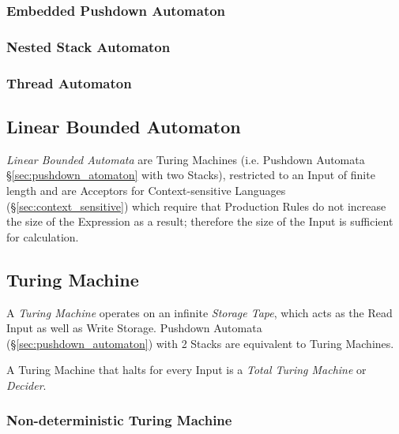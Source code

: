 \subsubsection{Embedded Pushdown Automaton}\label{sec:embedded_pushdown}

\subsubsection{Nested Stack Automaton}\label{sec:nested_stack_automaton}

\subsubsection{Thread Automaton}\label{sec:thread_automaton}



\subsection{Linear Bounded Automaton} \label{sec:linear_bounded_automaton}

\emph{Linear Bounded Automata} are Turing Machines (i.e. Pushdown
Automata \S\ref{sec:pushdown_atomaton} with two Stacks), restricted to
an Input of finite length and are Acceptors for Context-sensitive
Languages (\S\ref{sec:context_sensitive}) which require that
Production Rules do not increase the size of the Expression as a
result; therefore the size of the Input is sufficient for calculation.



\subsection{Turing Machine}\label{sec:turing_machine}

A \emph{Turing Machine} operates on an infinite \emph{Storage Tape},
which acts as the Read Input as well as Write Storage. Pushdown
Automata (\S\ref{sec:pushdown_automaton}) with 2 Stacks are equivalent
to Turing Machines.

A Turing Machine that halts for every Input is a \emph{Total Turing
  Machine} or \emph{Decider}.



\subsubsection{Non-deterministic Turing Machine}
\label{sec:nondeterministic_turing_machine}

